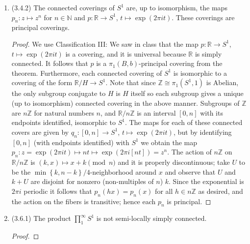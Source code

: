 \documentclass[11pt]{article}
\newcommand{\cbr}[1]{\left\{#1\right\}}
\begin{document}
\begin{enumerate}
\begin{proof}
      Note that $p_H(gx) = p_H(x)$ since $p_H$ is induced by $p$, for which $p(gx) = p(x)$ holds. If $H$ is normal in $G$ then observe that the $G/H$ action on $G/H$ by multiplication is transitive so by equivalence of categories the $G/H$ action on fibers is also transitive; and if $NH/H$ acts transitively on fibers then it should also act transitively on $G/H$, which means $NH = G$ as desired. Hence the covering is principal if and only if $N$ is normal in $G$.
    \end{proof}
    \item (3.4.2) The connected coverings of $S^1$ are, up to isomorphism, the maps $p_n\colon z\mapsto z^n$ for $n\in\mathbb{N}$ and $p\colon\mathbb{R}\to S^1$, $t\mapsto\exp(2\pi i t)$. These coverings are principal coverings. \begin{proof}
      We use Classification III: We saw in class that the map $p\colon\mathbb{R}\to S^1$, $t\mapsto\exp(2\pi i t)$ is a covering, and it is universal because $\mathbb{R}$ is simply connected. It follows that $p$ is a $\pi_1(B,b)$-principal covering from the theorem. Furthermore, each connected covering of $S^1$ is isomorphic to a covering of the form $\mathbb{R}/H\to S^1$. Note that since $\mathbb{Z} \cong \pi_1(S^1,1)$ is Abelian, the only subgroup conjugate to $H$ is $H$ itself so each subgroup gives a unique (up to isomorphism) connected covering in the above manner. Subgroups of $\mathbb{Z}$ are $n\mathbb{Z}$ for natural numbers $n$, and $\mathbb{R}/n\mathbb{Z}$ is an interval $[0,n]$ with its endpoints identified, isomorphic to $S^1$. The maps for each of these connected covers are given by $q_n\colon [0,n]\to S^1$, $t\mapsto \exp(2\pi i t)$, but by identifying $[0,n]$ (with endpoints identified) with $S^1$ we obtain the map $p_n\colon z = \exp(2\pi i t)\mapsto nt\mapsto \exp(2\pi i [nt]) = z^n$. The action of $n\mathbb{Z}$ on $\mathbb{R}/n\mathbb{Z}$ is $(k,x)\mapsto x+k \pmod n$ and it is properly discontinuous; take $U$ to be the $\min\cbr{k,n-k}/4$-neighborhood around $x$ and observe that $U$ and $k+U$ are disjoint for nonzero (non-multiples of $n$) $k$. Since the exponential is $2\pi i$ periodic it follows that $p_n(hx) = p_n(x)$ for all $h\in n\mathbb{Z}$ as desired, and the action on the fibers is transitive; hence each $p_n$ is principal.
    \end{proof}
    \item (3.6.1) The product $\prod_1^\infty S^1$ is not semi-locally simply connected. \begin{proof}

\end{proof}
\end{enumerate}
\end{document}
